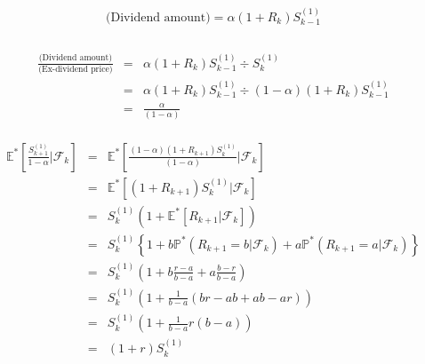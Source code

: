 \documentclass[12pt]{article}
\newenvironment{solution}[2][Solution]{\begin{trivlist}
\item[\hskip \labelsep {\bfseries #1}\hskip \labelsep {\bfseries #2.}]}{\end{trivlist}}
\newenvironment{question}[2][Question]{\begin{trivlist}
\item[\hskip \labelsep {\bfseries #1}\hskip \labelsep {\bfseries #2.}]}{\end{trivlist}}
\begin{document}
\begin{question}{2}
\end{question}
\begin{solution}[Solution] \\ 
\begin{eqnarray*}
\text{(Dividend amount)} = \alpha (1+R_k)S_{k-1}^{(1)} \\
\end{eqnarray*}\\ 

\begin{eqnarray*}
\frac{\text{(Dividend amount)}}{\text{(Ex-dividend price)}} &=& \alpha (1+R_k)S_{k-1}^{(1)} \div S_k^{(1)} \\
&=& \alpha (1+R_k)S_{k-1}^{(1)} \div (1-\alpha)(1+R_k)S_{k-1}^{(1)} \\
&=& \frac{\alpha}{(1-\alpha)}
\end{eqnarray*}\\ 

\newpage
{}
\begin{eqnarray*}
\mathbb{E}^* \left[\frac{S_{k+1}^{(1)}}{1-\alpha} \bigg| \mathcal{F}_k \right]
&=& \mathbb{E}^* \left[\frac{(1-\alpha)(1+R_{k+1})S_k^{(1)}}{(1-\alpha)} \bigg| \mathcal{F}_k \right] \\
&=& \mathbb{E}^* \left[(1+R_{k+1})S_k^{(1)} \bigg| \mathcal{F}_k \right] \\
&=& S_k^{(1)} \left(1+ \mathbb{E}^* \left[R_{k+1} \bigg| \mathcal{F}_k \right] \right)\\
&=& S_k^{(1)} \left\{ 1+ b\mathbb{P}^* (R_{k+1}=b|\mathcal{F}_k) + a\mathbb{P}^* (R_{k+1}=a | \mathcal{F}_k) \right\} \\
&=& S_k^{(1)} \left( 1+ b\frac{r-a}{b-a} + a\frac{b-r}{b-a}  \right) \\
&=& S_k^{(1)} \left( 1+ \frac{1}{b-a} \left( br-ab+ab-ar \right) \right) \\
&=& S_k^{(1)} \left( 1+ \frac{1}{b-a} r(b-a) \right) \\
&=& (1+r) S_k^{(1)}
\end{eqnarray*}\\ 
\end{solution}
\end{document}
